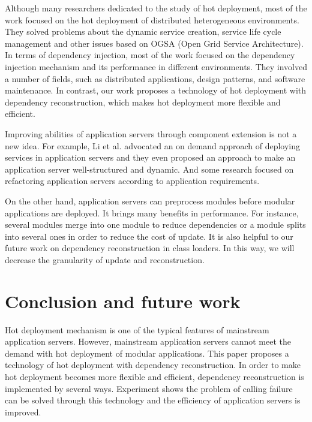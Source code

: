 \documentclass[conference]{IEEEtran}
\begin{document}
Although many researchers dedicated to the study of hot deployment, most of the work focused on the hot deployment of distributed heterogeneous environments\cite{related_hot_1, related_hot_2, related_hot_3, related_hot_4}.
They solved problems about the dynamic service creation, service life cycle management and other issues based on OGSA (Open Grid Service Architecture).
In terms of dependency injection, most of the work focused on the dependency injection mechanism and its performance in different environments\cite{related_DI_1, related_DI_2, related_DI_3}.
They involved a number of fields, such as distributed applications, design patterns, and software maintenance.
In contrast, our work proposes a technology of hot deployment with dependency reconstruction, which makes hot deployment more flexible and efficient.

Improving abilities of application servers through component extension is not a new idea.
For example, Li et al. advocated an on demand approach of deploying services in application servers\cite{related_AS_1} and they even proposed an approach to make an application server well-structured and dynamic\cite{related_AS_2}.
And some research focused on refactoring application servers according to application requirements\cite{related_AS_3}.
	
On the other hand, application servers can preprocess modules before modular applications are deployed.
It brings many benefits in performance. For instance, several modules merge into one module to reduce dependencies\cite{related_merge} or a module splits into several ones in order to reduce the cost of update\cite{related_split}.
It is also helpful to our future work on dependency reconstruction in class loaders.
In this way, we will decrease the granularity of update and reconstruction.


\section{Conclusion and future work\label{sec:conclusion}}
Hot deployment mechanism is one of the typical features of mainstream application servers.
However, mainstream application servers cannot meet the demand with hot deployment of modular applications.
This paper proposes a technology of hot deployment with dependency reconstruction.
In order to make hot deployment becomes more flexible and efficient, dependency reconstruction is implemented by several ways.
Experiment shows the problem of calling failure can be solved through this technology and the efficiency of application servers is improved.
\end{document}
